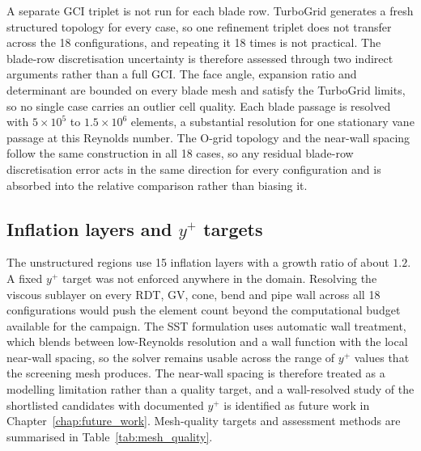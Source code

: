 A separate GCI triplet is not run for each blade row. TurboGrid generates a fresh structured topology for every case, so one refinement triplet does not transfer across the 18 configurations, and repeating it 18 times is not practical. The blade-row discretisation uncertainty is therefore assessed through two indirect arguments rather than a full GCI. The face angle, expansion ratio and determinant are bounded on every blade mesh and satisfy the TurboGrid limits, so no single case carries an outlier cell quality. Each blade passage is resolved with $5\times10^{5}$ to $1.5\times10^{6}$ elements, a substantial resolution for one stationary vane passage at this Reynolds number. The O-grid topology and the near-wall spacing follow the same construction in all 18 cases, so any residual blade-row discretisation error acts in the same direction for every configuration and is absorbed into the relative comparison rather than biasing it. 

\subsection{Inflation layers and \texorpdfstring{$y^+$}{y+} targets}
\label{sec:methods_inflation}

The unstructured regions use 15 inflation layers with a growth ratio of about $1.2$. A fixed $y^+$ target was not enforced anywhere in the domain. Resolving the viscous sublayer on every RDT, GV, cone, bend and pipe wall across all 18 configurations would push the element count beyond the computational budget available for the campaign. The SST formulation uses automatic wall treatment, which blends between low-Reynolds resolution and a wall function with the local near-wall spacing, so the solver remains usable across the range of $y^+$ values that the screening mesh produces. The near-wall spacing is therefore treated as a modelling limitation rather than a quality target, and a wall-resolved study of the shortlisted candidates with documented $y^+$ is identified as future work in Chapter~\ref{chap:future_work}. Mesh-quality targets and assessment methods are summarised in Table~\ref{tab:mesh_quality}.

